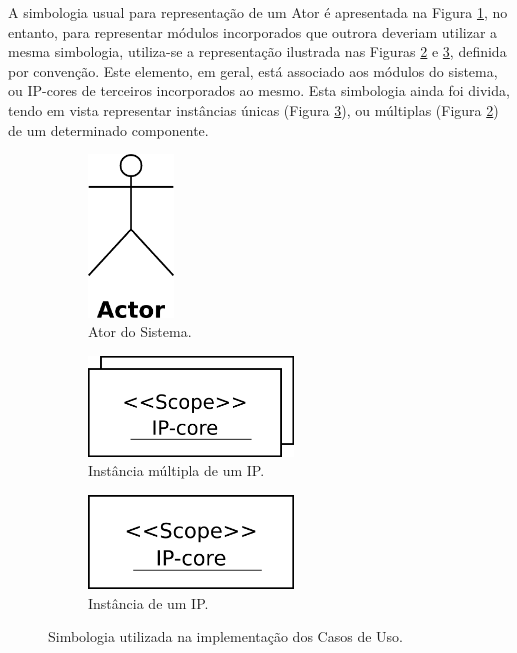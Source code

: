 \documentclass{article}
\begin{document}
  A simbologia usual para representação de um Ator é apresentada na Figura \ref{fig:actor_exemple}, no entanto, para representar módulos incorporados que outrora deveriam utilizar a mesma simbologia, utiliza-se a representação ilustrada nas Figuras \ref{fig:ipcore_exemple} e \ref{fig:ipcore_single_exemple}, definida por convenção. Este elemento, em geral, está associado aos módulos do sistema, ou IP-cores de terceiros incorporados ao mesmo. Esta simbologia ainda foi divida, tendo em vista representar instâncias únicas (Figura \ref{fig:ipcore_single_exemple}), ou múltiplas (Figura \ref{fig:ipcore_exemple}) de um determinado componente. 
  
  \FloatBarrier
  \begin{figure}[H]
    \centering
    \begin{subfigure}[b]{0.3\textwidth}
      \centering
      \includegraphics[width=0.25\textwidth]{actor_exemple.png}
      \caption{Ator do Sistema.}
      \label{fig:actor_exemple}
    \end{subfigure} 
    \begin{subfigure}[b]{0.3\textwidth}
      \centering
      \includegraphics[width=0.6\textwidth]{ipcore_exemple.png}
      \caption{Instância múltipla de um IP.}
      \label{fig:ipcore_exemple}
    \end{subfigure}
    \begin{subfigure}[b]{0.3\textwidth}
      \centering
      \includegraphics[width=0.6\textwidth]{ipcore_single_exemple.png}
      \caption{Instância de um IP.}
      \label{fig:ipcore_single_exemple}
    \end{subfigure}
    \caption{Simbologia utilizada na implementação dos Casos de Uso.}
    \label{fig:actors}
  \end{figure}
  
\end{document}
